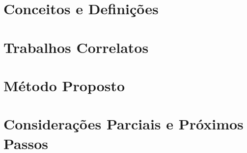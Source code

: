 \documentclass[
    12pt,       %
    oneside,    %
    a4paper,    %
%
    chapter=TITLE,	  	  %
%
    english,			  %
    brazil				  %
%
]{abntex2}
\begin{document}
\chapter{Conceitos e Definições}
\label{ch:fundamentacao}


\chapter{Trabalhos Correlatos}
\label{ch:correlatos}



\chapter{Método Proposto}
\label{ch:metodo}


\chapter{Considerações Parciais e Próximos Passos}
\label{ch:consideracoes}

%


\printindex
\end{document}
